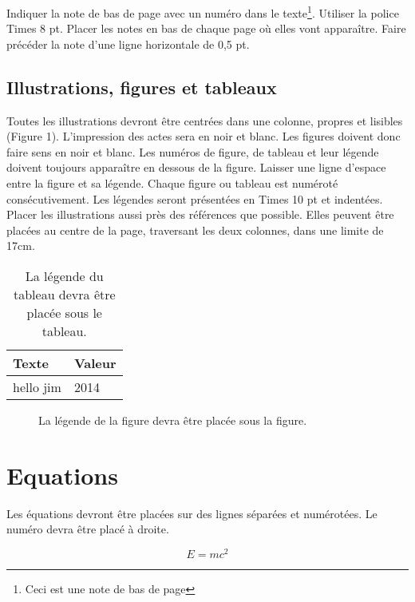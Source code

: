 \documentclass{article}
\begin{document}
Indiquer la note de bas de page avec un numéro dans le texte\footnote{Ceci est une note de bas de page}.  Utiliser la police Times 8 pt. Placer les notes en bas de chaque page où elles vont apparaître. Faire précéder la note d'une ligne horizontale de 0,5 pt.

\subsection{Illustrations, figures et tableaux}

Toutes les illustrations devront être centrées dans une colonne, propres et lisibles (Figure 1). L'impression des actes sera en noir et blanc. Les figures doivent donc faire sens en noir et blanc. Les numéros de figure, de tableau et leur légende doivent toujours apparaître en dessous de la figure. Laisser une ligne d'espace entre la figure et sa légende. Chaque figure ou tableau est numéroté consécutivement. Les légendes seront présentées en Times 10 pt et indentées. Placer les illustrations aussi près des références que possible. Elles peuvent être placées au centre de la page, traversant les deux colonnes, dans une limite de 17cm.

\begin{table}
\begin{center}
\begin{tabular}{|l|l|}
\hline
Texte & Valeur \\
\hline
hello jim  & 2014 \\
\hline
\end{tabular}
\end{center}
\caption{La légende du tableau devra être placée sous le tableau.}
\label{tab:example}
\end{table}

\begin{figure}
\centerline{}
\caption{La légende de la figure devra être placée sous la figure.}
\label{fig:example}
\end{figure}

\section{Equations}

Les équations devront être placées sur des lignes séparées et numérotées. Le numéro devra être placé à droite.

\begin{equation}
E=mc^{2}
\end{equation}
\end{document}
